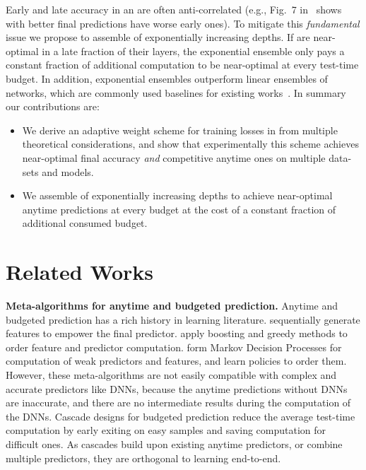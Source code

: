 Early and late accuracy in an \ann are often anti-correlated (e.g., Fig.~7 in~\cite{msdense} shows \anns with better final predictions have worse early ones). To mitigate this \emph{fundamental} issue we propose to assemble \anns of exponentially increasing depths. If \anns are near-optimal in a late fraction of their layers, the exponential ensemble only pays a constant fraction of additional computation to be near-optimal at every test-time budget. In addition, exponential ensembles outperform linear ensembles of networks, which are commonly used baselines for existing works~\cite{feedbacknet,msdense}. 
In summary our contributions are:
\begin{itemize}
    \item We derive an adaptive weight scheme for training losses in \anns from multiple theoretical considerations, and show that experimentally this scheme achieves near-optimal final accuracy \emph{and} competitive anytime ones on multiple data-sets and models.
    \item We assemble \anns of exponentially increasing depths to achieve near-optimal anytime predictions at every budget at the cost of a constant fraction of additional consumed budget. 
\end{itemize}



\section{Related Works}
\label{sec:background}


\textbf{Meta-algorithms for anytime and budgeted prediction.}
Anytime and budgeted prediction has a rich history in learning literature.
\cite{weinberger09feature,xu:12,xu:13b} sequentially generate features to empower the final predictor.
\cite{reyzin:11,speedboost,hu:16} apply boosting and greedy methods to order feature and predictor computation.  
\cite{timeliness,rl_anytime} form Markov Decision Processes for computation of weak predictors and features, and learn policies to order them. However, these meta-algorithms are not easily compatible with complex and accurate predictors like DNNs, because the anytime predictions without DNNs are inaccurate, and there are no intermediate results during the computation of the DNNs.
Cascade designs for budgeted prediction \cite{cascade,lefakis:10,chen:12,xu:14,cai:15,adaptive_select,adaptivenn,cascade_nn} reduce the average test-time computation by early exiting on easy samples and saving computation for difficult ones. As cascades build upon existing anytime predictors, or combine multiple predictors, they are orthogonal to learning \anns end-to-end.

